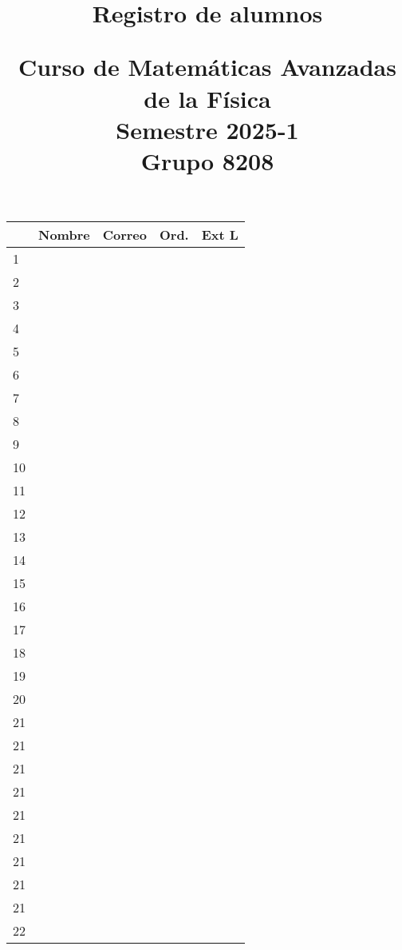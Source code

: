 \documentclass[11pt]{article}
\title{Registro de alumnos \\ \begin{large}Curso de Matemáticas Avanzadas de la Física \\ Semestre 2025-1   \\ Grupo 8208 \end{large}}
\author{}
\date{ }
\begin{document}
\maketitle
\fontsize{12}{12}\selectfont

\begin{longtable}{| l | >{\centering\arraybackslash}m{7cm}| >{\centering\arraybackslash}m{5cm} | c | c |}
\hline
 & Nombre & Correo & Ord. & Ext L \\
\endhead
\hline 1 & & & & \\
\hline 2 & & & &  \\
\hline 3 & & & &  \\
\hline 4 & & & &  \\
\hline 5 & & & &  \\
\hline 6 & & & &  \\
\hline 7 & & & &  \\
\hline 8 & & & &  \\
\hline 9 & & & &  \\
\hline 10 & & & &  \\
\hline 11 & & & &  \\
\hline 12 & & & &  \\
\hline 13 & & & &  \\
\hline 14 & & & &  \\
\hline 15 & & & &  \\
\hline 16 & & & &  \\
\hline 17 & & & &  \\
\hline 18 & & & &  \\
\hline 19 & & & &  \\
\hline 20 & & & &  \\
\hline 21 & & & &  \\
\hline 21 & & & &  \\
\hline 21 & & & &  \\
\hline 21 & & & &  \\
\hline 21 & & & &  \\
\hline 21 & & & &  \\
\hline 21 & & & &  \\
\hline 21 & & & &  \\
\hline 21 & & & &  \\
\hline 22 & & & &  \\
\hline
\end{longtable}
\end{document}
